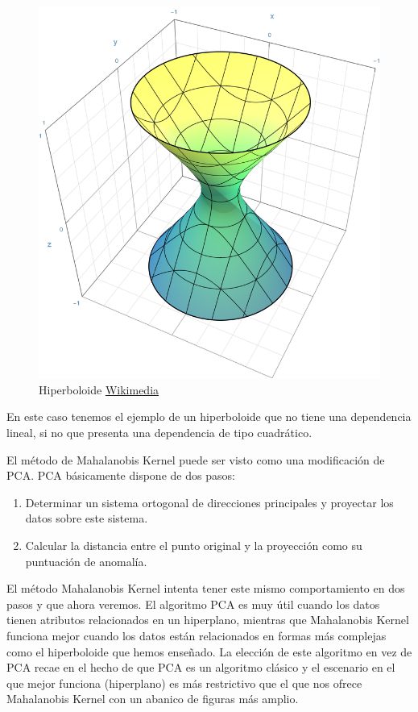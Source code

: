 \begin{figure}[H]
	\centering
	\label{hiperboloide}
	\includegraphics[scale=2.5]{imagenes/hiperboloide}
	\caption{Hiperboloide \href{https://commons.wikimedia.org/wiki/File:Circular_Hyperboloid_Of_One_Sheet_Quadric.png}{Wikimedia}}
\end{figure}

En este caso tenemos el ejemplo de un hiperboloide que no tiene una dependencia lineal, si no que presenta una dependencia de tipo cuadrático.

El método de Mahalanobis Kernel puede ser visto como una modificación de PCA. PCA básicamente dispone de dos pasos:

\begin{enumerate}
	\item Determinar un sistema ortogonal de direcciones principales y proyectar los datos sobre este sistema.
	\item Calcular la distancia entre el punto original y la proyección como su puntuación de anomalía.
\end{enumerate}

El método Mahalanobis Kernel intenta tener este mismo comportamiento en dos pasos y que ahora veremos. El algoritmo PCA es muy útil cuando los datos tienen atributos relacionados en un hiperplano, mientras que Mahalanobis Kernel funciona mejor cuando los datos están relacionados en formas más complejas como el hiperboloide que hemos enseñado. La elección de este algoritmo en vez de PCA recae en el hecho de que PCA es un algoritmo clásico y el escenario en el que mejor funciona (hiperplano) es más restrictivo que el que nos ofrece Mahalanobis Kernel con un abanico de figuras más amplio.

